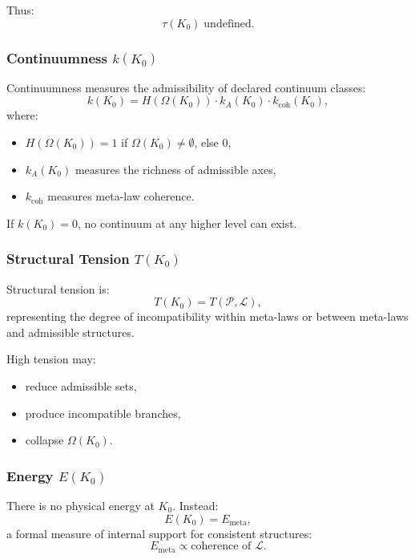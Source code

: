 Thus:
\[
\tau(K_0) \;\text{undefined}.
\]

\subsubsection{Continuumness \texorpdfstring{$k(K_0)$}{k(K_0)}}

Continuumness measures the admissibility of declared continuum classes:
\[
k(K_0) =
H(\Omega(K_0)) \cdot
k_A(K_0) \cdot
k_{\mathrm{coh}}(K_0),
\]
where:
\begin{itemize}
    \item $H(\Omega(K_0)) = 1$ if $\Omega(K_0)\neq\emptyset$, else $0$,
    \item $k_A(K_0)$ measures the richness of admissible axes,
    \item $k_{\mathrm{coh}}$ measures meta-law coherence.
\end{itemize}

If $k(K_0)=0$, no continuum at any higher level can exist.

\subsubsection{Structural Tension \texorpdfstring{$T(K_0)$}{T(K_0)}}

Structural tension is:
\[
T(K_0) = T(\mathcal{P}, \mathcal{L}),
\]
representing the degree of incompatibility within meta-laws or between
meta-laws and admissible structures.

High tension may:
\begin{itemize}
    \item reduce admissible sets,
    \item produce incompatible branches,
    \item collapse $\Omega(K_0)$.
\end{itemize}

\subsubsection{Energy \texorpdfstring{$E(K_0)$}{E(K_0)}}

There is no physical energy at $K_0$.
Instead:
\[
E(K_0) = E_{\mathrm{meta}},
\]
a formal measure of internal support for consistent structures:
\[
E_{\mathrm{meta}} \propto \text{coherence of }\mathcal{L}.
\]

